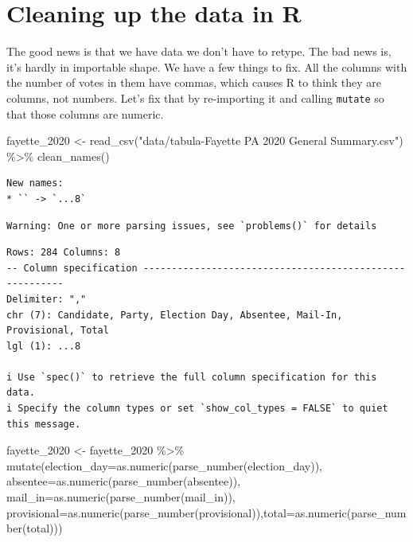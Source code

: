 \documentclass[
  letterpaper,
  DIV=11,
  numbers=noendperiod]{scrreprt}
\newenvironment{Shaded}{\begin{snugshade}}{\end{snugshade}}
\newcommand{\AttributeTok}[1]{\textcolor[rgb]{0.40,0.45,0.13}{#1}}
\newcommand{\FunctionTok}[1]{\textcolor[rgb]{0.28,0.35,0.67}{#1}}
\newcommand{\NormalTok}[1]{\textcolor[rgb]{0.00,0.23,0.31}{#1}}
\newcommand{\OtherTok}[1]{\textcolor[rgb]{0.00,0.23,0.31}{#1}}
\newcommand{\SpecialCharTok}[1]{\textcolor[rgb]{0.37,0.37,0.37}{#1}}
\newcommand{\StringTok}[1]{\textcolor[rgb]{0.13,0.47,0.30}{#1}}
\begin{document}
\hypertarget{cleaning-up-the-data-in-r}{%
\section{Cleaning up the data in R}\label{cleaning-up-the-data-in-r}}

The good news is that we have data we don't have to retype. The bad news
is, it's hardly in importable shape. We have a few things to fix. All
the columns with the number of votes in them have commas, which causes R
to think they are columns, not numbers. Let's fix that by re-importing
it and calling \texttt{mutate} so that those columns are numeric.

\begin{Shaded}
\begin{Highlighting}[]
\NormalTok{fayette\_2020 }\OtherTok{\textless{}{-}} \FunctionTok{read\_csv}\NormalTok{(}\StringTok{"data/tabula{-}Fayette PA 2020 General Summary.csv"}\NormalTok{) }\SpecialCharTok{\%\textgreater{}\%} \FunctionTok{clean\_names}\NormalTok{()}
\end{Highlighting}
\end{Shaded}

\begin{verbatim}
New names:
* `` -> `...8`
\end{verbatim}

\begin{verbatim}
Warning: One or more parsing issues, see `problems()` for details
\end{verbatim}

\begin{verbatim}
Rows: 284 Columns: 8
-- Column specification --------------------------------------------------------
Delimiter: ","
chr (7): Candidate, Party, Election Day, Absentee, Mail-In, Provisional, Total
lgl (1): ...8

i Use `spec()` to retrieve the full column specification for this data.
i Specify the column types or set `show_col_types = FALSE` to quiet this message.
\end{verbatim}

\begin{Shaded}
\begin{Highlighting}[]
\NormalTok{fayette\_2020 }\OtherTok{\textless{}{-}}\NormalTok{ fayette\_2020 }\SpecialCharTok{\%\textgreater{}\%} \FunctionTok{mutate}\NormalTok{(}\AttributeTok{election\_day=}\FunctionTok{as.numeric}\NormalTok{(}\FunctionTok{parse\_number}\NormalTok{(election\_day)), }\AttributeTok{absentee=}\FunctionTok{as.numeric}\NormalTok{(}\FunctionTok{parse\_number}\NormalTok{(absentee)), }\AttributeTok{mail\_in=}\FunctionTok{as.numeric}\NormalTok{(}\FunctionTok{parse\_number}\NormalTok{(mail\_in)), }\AttributeTok{provisional=}\FunctionTok{as.numeric}\NormalTok{(}\FunctionTok{parse\_number}\NormalTok{(provisional)),}\AttributeTok{total=}\FunctionTok{as.numeric}\NormalTok{(}\FunctionTok{parse\_number}\NormalTok{(total)))}
\end{Highlighting}
\end{Shaded}
\end{document}
